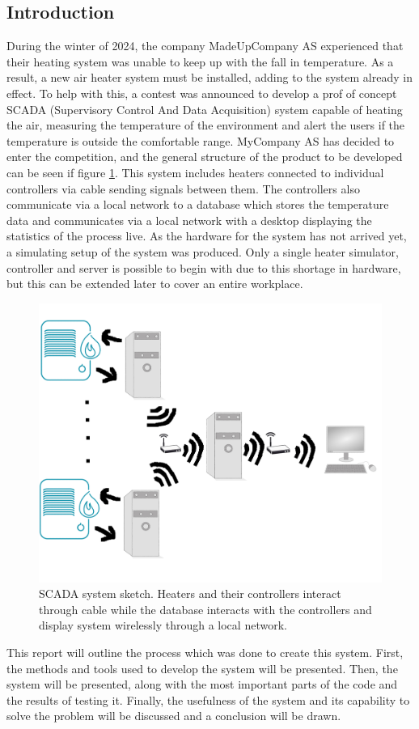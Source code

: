 \documentclass[11pt, A4paper, english]{article}
\numberwithin{equation}{section}
\begin{document}
\begin{multicols}{2}
		\section{Introduction}
During the winter of 2024, the company MadeUpCompany AS experienced that their heating system was unable to keep up with the fall in temperature. As a result, a new air heater system must be installed, adding to the system already in effect. To help with this, a contest was announced to develop a prof of concept SCADA (Supervisory Control And Data Acquisition) system capable of heating the air, measuring the temperature of the environment and alert the users if the temperature is outside the comfortable range. MyCompany AS has decided to enter the competition, and the general structure of the product to be developed can be seen if figure \ref{fig:system_sketch}. This system includes heaters connected to individual controllers via cable sending signals between them. The controllers also communicate via a local network to a database which stores the temperature data and communicates via a local network with a desktop displaying the statistics of the process live. As the hardware for the system has not arrived yet, a simulating setup of the system was produced. Only a single heater simulator, controller and server is possible to begin with due to this shortage in hardware, but this can be extended later to cover an entire workplace. \\
			\begin{figure}[H]
\includegraphics[width=\columnwidth]{SCADA_sketch.png}
\caption{SCADA system sketch. Heaters and their controllers interact through cable while the database interacts with the controllers and display system wirelessly through a local network.}
\label{fig:system_sketch}
			\end{figure}
This report will outline the process which was done to create this system. First, the methods and tools used to develop the system will be presented. Then, the system will be presented, along with the most important parts of the code and the results of testing it. Finally, the usefulness of the system and its capability to solve the problem will be discussed and a conclusion will be drawn.
		

\end{multicols}
\end{document}

